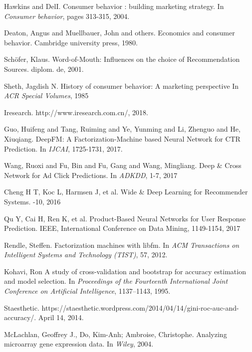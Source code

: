 \documentclass{article}
\begin{document}
	\begin{thebibliography}{10}
		
        Hawkins and DelI.
        \newblock Consumer behavior : building marketing strategy.
        \newblock In {\em Consumer behavior}, pages 313-315, 2004.

        Deaton, Angus and Muellbauer, John and others.
        \newblock Economics and consumer behavior.
        \newblock Cambridge university press, 1980.

        Sch{\"o}fer, Klaus.
        \newblock Word-of-Mouth: Influences on the choice of Recommendation Sources.
        \newblock diplom. de, 2001.

        Sheth, Jagdish N.
        \newblock History of consumer behavior: A marketing perspective
        \newblock In {\em ACR Special Volumes}, 1985
        
        Iresearch.
        \newblock http://www.iresearch.com.cn/, 2018.

        Guo, Huifeng and Tang, Ruiming and Ye, Yunming and Li, Zhenguo and He, Xiuqiang.
        \newblock DeepFM: A Factorization-Machine based Neural Network for CTR Prediction.
        \newblock In {\em IJCAI}, 1725-1731, 2017.

        Wang, Ruoxi and Fu, Bin and Fu, Gang and Wang, Mingliang.
        \newblock Deep \& Cross Network for Ad Click Predictions.
        \newblock In {\em ADKDD}, 1-7, 2017
		
        Cheng H T, Koc L, Harmsen J, et al. 
        \newblock Wide \& Deep Learning for Recommender Systems. 
        -10, 2016

        Qu Y, Cai H, Ren K, et al. 
        \newblock Product-Based Neural Networks for User Response Prediction.
        \newblock IEEE, International Conference on Data Mining, 1149-1154, 2017

        Rendle, Steffen.
        \newblock Factorization machines with libfm.
        \newblock In {\em ACM Transactions on Intelligent Systems and Technology (TIST)}, 57, 2012.

        Kohavi, Ron
        \newblock A study of cross-validation and bootstrap for accuracy estimation and model selection.
        \newblock In {\em Proceedings of the Fourteenth International Joint Conference on Artificial Intelligence}, 1137–1143, 1995.

        Staesthetic.
        \newblock https://staesthetic.wordpress.com/2014/04/14/gini-roc-auc-and-accuracy/.
        \newblock April 14, 2014.

        McLachlan, Geoffrey J., Do, Kim-Anh; Ambroise, Christophe.
        \newblock Analyzing microarray gene expression data.
        \newblock In {\em Wiley}, 2004.

	\end{thebibliography}
	
	\clearpage
	
	\newpage
	
	
\end{document}
